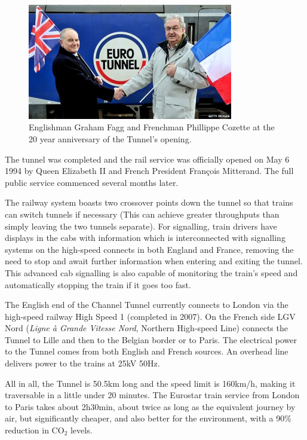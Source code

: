 \documentclass[12pt]{article} %
\begin{document}
\begin{figure}[hp]
  \centering
  \includegraphics[width=0.8\textwidth]{20years}
  \caption{Englishman Graham Fagg and Frenchman Phillippe Cozette at the 20 year anniversary of the Tunnel's opening.}
  \label{fig:20y}
\end{figure}

The tunnel was completed and the rail service was officially opened on May 6 1994 by Queen Elizabeth II and French President François Mitterand. The full public service commenced several months later.

The railway system boasts two crossover points down the tunnel so that trains can switch tunnels if necessary (This can achieve greater throughputs than simply leaving the two tunnels separate). For signalling, train drivers have displays in the cabs with information which is interconnected with signalling systems on the high-speed connects in both England and France, removing the need to stop and await further information when entering and exiting the tunnel. This advanced cab signalling is also capable of monitoring the train's speed and automatically stopping the train if it goes too fast.

The English end of the Channel Tunnel currently connects to London via the high-speed railway High Speed 1 (completed in 2007). On the French side LGV Nord (\emph{Ligne à Grande Vitesse Nord}, Northern High-speed Line) connects the Tunnel to Lille and then to the Belgian border or to Paris. The electrical power to the Tunnel comes from both English and French sources. An overhead line delivers power to the trains at 25kV 50Hz.

All in all, the Tunnel is 50.5km long and the speed limit is 160km/h, making it traversable in a little under 20 minutes. The Eurostar train service from London to Paris takes about 2h30min, about twice as long as the equivalent journey by air, but significantly cheaper, and also better for the environment, with a 90\% reduction in CO$_2$ levels.\cite{env61}
\end{document}
